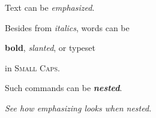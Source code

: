 \documentclass{article}
\begin{document}
Text can be \emph{emphasized}.

Besides from \textit{italics}, words can be

\textbf{bold}, \textsl{slanted}, or typeset

in \textsc {Small Caps}.

Such commands can be \textit{\textbf{nested}}.

\emph{See how \emph{emphasizing} looks when nested.}
\end{document}
